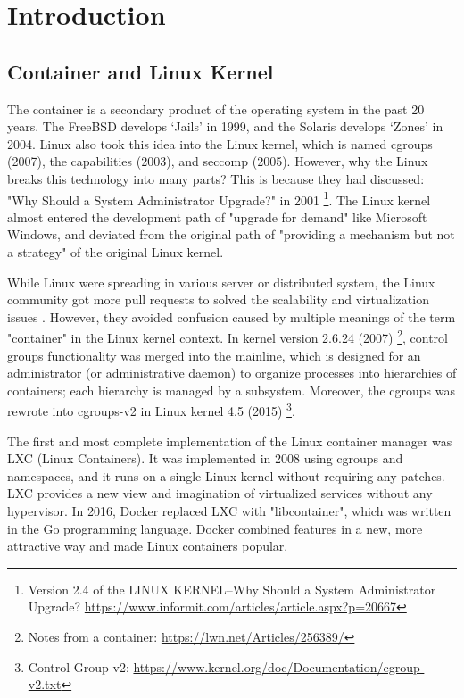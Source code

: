\chapter{Introduction}

\section{Container and Linux Kernel}

The container is a secondary product of the operating system in the past 20 years.
The FreeBSD develops `Jails' in 1999, and the Solaris develops `Zones' in 2004.
Linux also took this idea into the Linux kernel, which is named cgroups (2007),
the capabilities (2003), and seccomp (2005). However, why the Linux breaks this
technology into many parts? This is because they had discussed:
"Why Should a System Administrator Upgrade?" in 2001
\footnote{Version 2.4 of the LINUX KERNEL--Why Should a System Administrator Upgrade?
    \url{https://www.informit.com/articles/article.aspx?p=20667}}.
The Linux kernel almost entered the development path of "upgrade for demand" like
Microsoft Windows, and deviated from the original path of "providing a mechanism
but not a strategy" of the original Linux kernel.

While Linux were spreading in various server or distributed system, the
Linux community got more pull requests to solved the scalability and virtualization
issues \cite{267148}. However, they avoided confusion caused by multiple meanings of
the term "container" in the Linux kernel context. In kernel version 2.6.24 (2007)
\footnote{Notes from a container: \url{https://lwn.net/Articles/256389/}},
control groups functionality was merged into the mainline,
which is designed for an administrator (or administrative daemon) to organize processes
into hierarchies of containers; each hierarchy is managed by a subsystem. Moreover, the
cgroups was rewrote into cgroups-v2 in Linux kernel 4.5 (2015)
\footnote{Control Group v2: \url{https://www.kernel.org/doc/Documentation/cgroup-v2.txt}}.

The first and most complete implementation of the Linux container manager was LXC
(Linux Containers). It was implemented in 2008 using cgroups and namespaces,
and it runs on a single Linux kernel without requiring any patches. LXC provides
a new view and imagination of virtualized services without any hypervisor. In 2016,
Docker replaced LXC with "libcontainer", which was written in the Go programming language.
Docker combined features in a new, more attractive way and made Linux containers popular.

